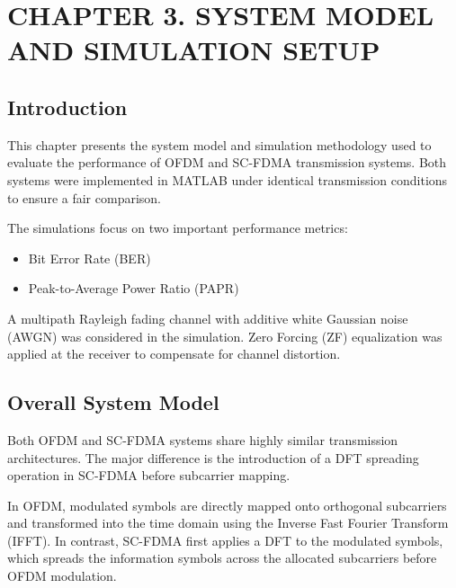 \section*{CHAPTER 3. SYSTEM MODEL AND SIMULATION SETUP}

\setcounter{section}{3}
\setcounter{subsection}{0}
\setcounter{figure}{0}
\setcounter{table}{0}
\setcounter{equation}{0}

\subsection{Introduction}

This chapter presents the system model and simulation methodology used to
evaluate the performance of OFDM and SC-FDMA transmission systems. Both
systems were implemented in MATLAB under identical transmission
conditions to ensure a fair comparison.

The simulations focus on two important performance metrics:

\begin{itemize}
    \item Bit Error Rate (BER)
    \item Peak-to-Average Power Ratio (PAPR)
\end{itemize}

A multipath Rayleigh fading channel with additive white Gaussian noise
(AWGN) was considered in the simulation. Zero Forcing (ZF) equalization
was applied at the receiver to compensate for channel distortion.

\subsection{Overall System Model}

Both OFDM and SC-FDMA systems share highly similar transmission
architectures. The major difference is the introduction of a DFT spreading
operation in SC-FDMA before subcarrier mapping.

In OFDM, modulated symbols are directly mapped onto orthogonal
subcarriers and transformed into the time domain using the Inverse Fast
Fourier Transform (IFFT). In contrast, SC-FDMA first applies a DFT to the
modulated symbols, which spreads the information symbols across the
allocated subcarriers before OFDM modulation.

